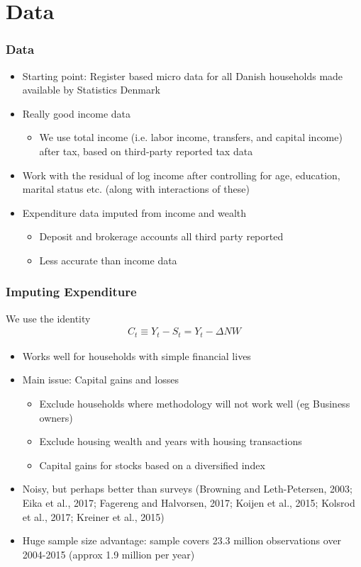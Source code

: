 \documentclass{beamer}
\begin{document}
\section{Data}
\frame
{
	\frametitle{Data}
	\begin{itemize}
		\item Starting point: Register based micro data for all Danish households made available by Statistics Denmark
		\item Really good income data
		\begin{itemize}
			\item We use total income (i.e. labor income, transfers, and capital income) after tax, based on third-party reported tax data
		\end{itemize}
		\item Work with the residual of log income after controlling for age, education, marital status etc. (along with interactions of these)
		\item Expenditure data imputed from income and wealth
		\begin{itemize}
			\item Deposit and brokerage accounts all third party reported
			\item Less accurate than income data
		\end{itemize}
	\end{itemize}
}
\frame
{
	\frametitle{Imputing Expenditure}
	We use the identity
		\begin{align*}
			C_t \equiv Y_t - S_t = Y_t - \Delta NW
		\end{align*}
	\begin{itemize}
		\item Works well for households with simple financial lives
		\item Main issue: Capital gains and losses
		\begin{itemize}
			\item Exclude households where methodology will not work well (eg Business owners)
			\item Exclude housing wealth and years with housing transactions
			\item Capital gains for stocks based on a diversified index
		\end{itemize}
		\item Noisy, but perhaps better than surveys (Browning and Leth-Petersen, 2003; Eika et al., 2017; Fagereng and Halvorsen, 2017; Koijen et al., 2015; Kolsrod et al., 2017; Kreiner et al., 2015)
		\item Huge sample size advantage: sample covers 23.3 million observations over 2004-2015 (approx 1.9 million per year)
	\end{itemize}
}
\end{document}

